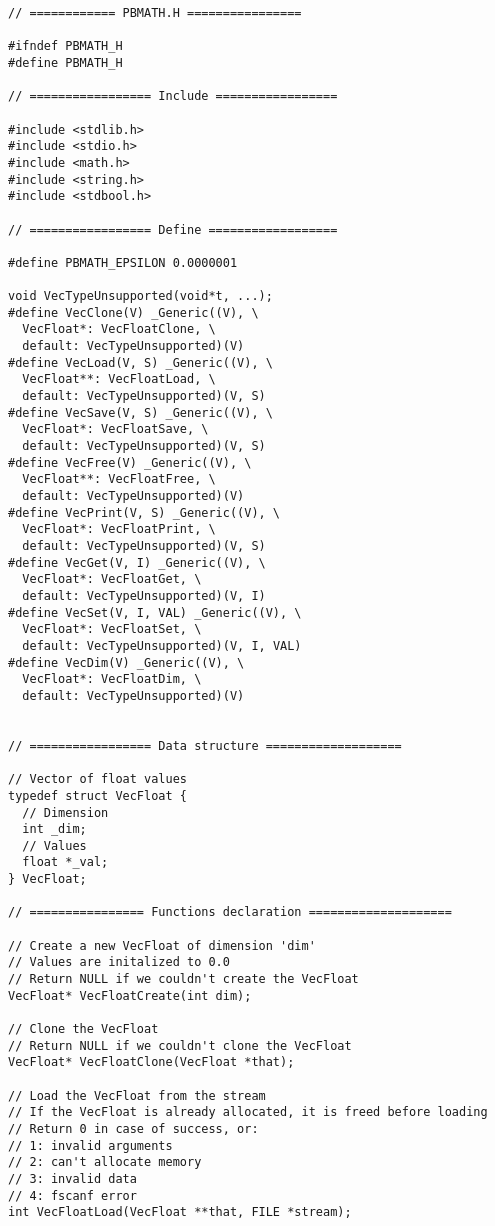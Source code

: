 \documentclass[12pt, a4paper]{article}
\begin{document}
\begin{scriptsize}
\begin{ttfamily}
\begin{lstlisting}
// ============ PBMATH.H ================

#ifndef PBMATH_H
#define PBMATH_H

// ================= Include =================

#include <stdlib.h>
#include <stdio.h>
#include <math.h>
#include <string.h>
#include <stdbool.h>

// ================= Define ==================

#define PBMATH_EPSILON 0.0000001

void VecTypeUnsupported(void*t, ...); 
#define VecClone(V) _Generic((V), \
  VecFloat*: VecFloatClone, \
  default: VecTypeUnsupported)(V)
#define VecLoad(V, S) _Generic((V), \
  VecFloat**: VecFloatLoad, \
  default: VecTypeUnsupported)(V, S)
#define VecSave(V, S) _Generic((V), \
  VecFloat*: VecFloatSave, \
  default: VecTypeUnsupported)(V, S)
#define VecFree(V) _Generic((V), \
  VecFloat**: VecFloatFree, \
  default: VecTypeUnsupported)(V)
#define VecPrint(V, S) _Generic((V), \
  VecFloat*: VecFloatPrint, \
  default: VecTypeUnsupported)(V, S)
#define VecGet(V, I) _Generic((V), \
  VecFloat*: VecFloatGet, \
  default: VecTypeUnsupported)(V, I)
#define VecSet(V, I, VAL) _Generic((V), \
  VecFloat*: VecFloatSet, \
  default: VecTypeUnsupported)(V, I, VAL)
#define VecDim(V) _Generic((V), \
  VecFloat*: VecFloatDim, \
  default: VecTypeUnsupported)(V)


// ================= Data structure ===================

// Vector of float values
typedef struct VecFloat {
  // Dimension
  int _dim;
  // Values
  float *_val;
} VecFloat;

// ================ Functions declaration ====================

// Create a new VecFloat of dimension 'dim'
// Values are initalized to 0.0
// Return NULL if we couldn't create the VecFloat
VecFloat* VecFloatCreate(int dim);

// Clone the VecFloat
// Return NULL if we couldn't clone the VecFloat
VecFloat* VecFloatClone(VecFloat *that);

// Load the VecFloat from the stream
// If the VecFloat is already allocated, it is freed before loading
// Return 0 in case of success, or:
// 1: invalid arguments
// 2: can't allocate memory
// 3: invalid data
// 4: fscanf error
int VecFloatLoad(VecFloat **that, FILE *stream);


\end{lstlisting}
\end{ttfamily}
\end{scriptsize}
\end{document}
